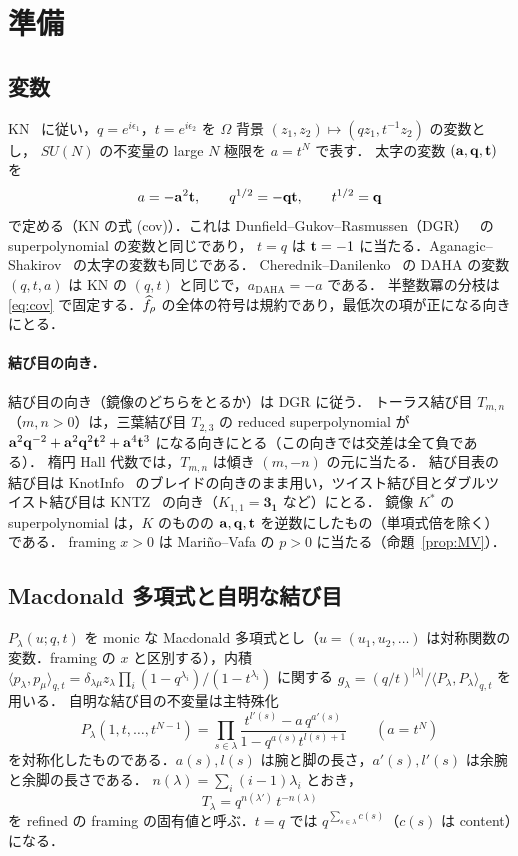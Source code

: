 \section{準備}\label{sec:prelim}

\subsection{変数}
KN~\cite{Kameyama17} に従い，$q=e^{i\epsilon_1}$，$t=e^{i\epsilon_2}$ を $\Omega$ 背景 $(z_1,z_2)\mapsto(qz_1,t^{-1}z_2)$ の変数とし，
$SU(N)$ の不変量の large $N$ 極限を $a=t^N$ で表す．
太字の変数 $(\mathbf{a},\mathbf{q},\mathbf{t})$ を
\begin{equation}\label{eq:cov}
a=-\mathbf{a}^2\mathbf{t},\qquad q^{1/2}=-\mathbf{q}\mathbf{t},\qquad t^{1/2}=\mathbf{q}
\end{equation}
で定める（KN の式 (cov)）．これは Dunfield--Gukov--Rasmussen（DGR）~\cite{Dunfield05} の superpolynomial の変数と同じであり，
$t=q$ は $\mathbf{t}=-1$ に当たる．Aganagic--Shakirov~\cite{Aganagic11} の太字の変数も同じである．
Cherednik--Danilenko~\cite{Cherednik14} の DAHA の変数 $(q,t,a)$ は KN の $(q,t)$ と同じで，$a_{\mathrm{DAHA}}=-a$ である．
半整数冪の分枝は \eqref{eq:cov} で固定する．$\widehat{f}_\rho$ の全体の符号は規約であり，最低次の項が正になる向きにとる．

\paragraph{結び目の向き．}
結び目の向き（鏡像のどちらをとるか）は DGR に従う．
トーラス結び目 $T_{m,n}$（$m,n>0$）は，三葉結び目 $T_{2,3}$ の reduced superpolynomial が $\mathbf{a}^2\mathbf{q}^{-2}+\mathbf{a}^2\mathbf{q}^2\mathbf{t}^2+\mathbf{a}^4\mathbf{t}^3$ になる向きにとる（この向きでは交差は全て負である）．
楕円 Hall 代数では，$T_{m,n}$ は傾き $(m,-n)$ の元に当たる．
結び目表の結び目は KnotInfo~\cite{KnotInfo} のブレイドの向きのまま用い，ツイスト結び目とダブルツイスト結び目は KNTZ~\cite{Kameyama19} の向き（$K_{1,1}=\mathbf{3_1}$ など）にとる．
鏡像 $K^\ast$ の superpolynomial は，$K$ のものの $\mathbf{a},\mathbf{q},\mathbf{t}$ を逆数にしたもの（単項式倍を除く）である．
framing $x>0$ は Mariño--Vafa の $p>0$ に当たる（命題~\ref{prop:MV}）．

\subsection{Macdonald 多項式と自明な結び目}
$P_\lambda(u;q,t)$ を monic な Macdonald 多項式とし（$u=(u_1,u_2,\dots)$ は対称関数の変数．framing の $x$ と区別する），内積 $\langle p_\lambda,p_\mu\rangle_{q,t}=\delta_{\lambda\mu}z_\lambda\prod_i(1-q^{\lambda_i})/(1-t^{\lambda_i})$ に関する
$g_\lambda=(q/t)^{|\lambda|}/\langle P_\lambda,P_\lambda\rangle_{q,t}$ を用いる．
自明な結び目の不変量は主特殊化
\[
P_\lambda(1,t,\dots,t^{N-1})=\prod_{s\in\lambda}\frac{t^{l'(s)}-a\,q^{a'(s)}}{1-q^{a(s)}t^{l(s)+1}}\qquad(a=t^N)
\]
を対称化したものである．$a(s),l(s)$ は腕と脚の長さ，$a'(s),l'(s)$ は余腕と余脚の長さである．
$n(\lambda)=\sum_i(i-1)\lambda_i$ とおき，
\[
T_\lambda=q^{n(\lambda')}\,t^{-n(\lambda)}
\]
を refined の framing の固有値と呼ぶ．$t=q$ では $q^{\sum_{s\in\lambda}c(s)}$（$c(s)$ は content）になる．

